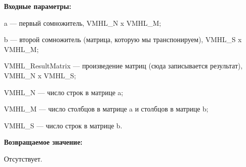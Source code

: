 \textbf{Входные параметры:}
 
a --- первый сомножитель, VMHL\_N x VMHL\_M;
 
b --- второй сомножитель (матрица, которую мы транспонируем), VMHL\_S x VMHL\_M;
 
VMHL\_ResultMatrix --- произведение матриц (сюда записывается результат), VMHL\_N x VMHL\_S;
 
VMHL\_N --- число строк в матрице a;
 
VMHL\_M --- число столбцов в матрице a и столбцов в матрице b;
 
VMHL\_S --- число строк в матрице b.

\textbf{Возвращаемое значение:}

Отсутствует.